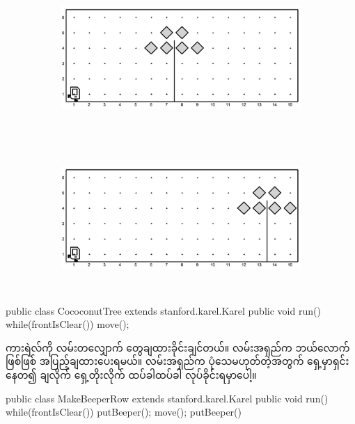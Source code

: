 \begin{sloppypar}
\begin{figure}[tbh!]
    \caption{}
    \begin{subfigure}[t]{0.46\textwidth}
        \includegraphics[height=2.2in, left]{ch02/CoconutTree/a.jpg}
        \caption{}
        \label{subfig:CoCoconutTreeA}
    \end{subfigure}

    \begin{subfigure}[t]{0.46\textwidth}
        \includegraphics[height=2.2in, left]{ch02/CoconutTree/b.jpg}
        \caption{}
    \end{subfigure}
\end{figure}

\begin{lstcodesimple}[float, caption={\mycodelstcpt{CococonutTree.java} \myenlstcpt{A}}, label={lst:CococonutTree}]
public class CococonutTree extends stanford.karel.Karel{
    public void run(){
            while(frontIsClear()){
                    move();
            }
    }
}
\end{lstcodesimple}

ကားရဲလ်ကို လမ်းတလျှောက် \mmbeeper  တွေချထားခိုင်းချင်တယ်။ လမ်းအရှည်က ဘယ်လောက်ဖြစ်ဖြစ် အပြည့်ချထားပေးရမယ်။ လမ်းအရှည်က ပုံသေမဟုတ်တဲ့အတွက် ရှေ့မှာရှင်းနေတ၍ \mmbeeper ချလိုက် ရှေ့တိုးလိုက် ထပ်ခါထပ်ခါ လုပ်ခိုင်းရမှာပေါ့။ 

\begin{lstcodesimple}[float, caption={\mycodelstcpt{MakeBeeperRow.java} \myenlstcpt{A}}, label={lst:MakeBeeperRow}]
public class MakeBeeperRow extends stanford.karel.Karel{
    public void run(){
            while(frontIsClear()){
                    putBeeper();
                    move();
            }
            putBeeper()
    }
}
\end{lstcodesimple}


\end{sloppypar}
